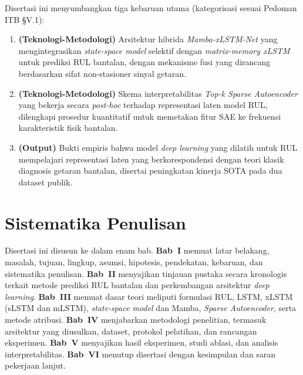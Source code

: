 Disertasi ini menyumbangkan tiga kebaruan utama (kategorisasi
sesuai Pedoman ITB §V.1):

\begin{enumerate}
  \item \textbf{(Teknologi-Metodologi)} Arsitektur hibrida
        \emph{Mamba-xLSTM-Net} yang mengintegrasikan
        \emph{state-space model} selektif dengan
        \emph{matrix-memory xLSTM} untuk prediksi RUL bantalan,
        dengan mekanisme fusi yang dirancang berdasarkan sifat
        non-stasioner sinyal getaran.
  \item \textbf{(Teknologi-Metodologi)} Skema interpretabilitas
        \emph{Top-k Sparse Autoencoder} yang bekerja secara
        \emph{post-hoc} terhadap representasi laten model RUL,
        dilengkapi prosedur kuantitatif untuk memetakan fitur SAE
        ke frekuensi karakteristik fisik bantalan.
  \item \textbf{(Output)} Bukti empiris bahwa model \emph{deep
        learning} yang dilatih untuk RUL mempelajari representasi
        laten yang berkorespondensi dengan teori klasik diagnosis
        getaran bantalan, disertai peningkatan kinerja SOTA pada
        dua dataset publik.
\end{enumerate}

\section{Sistematika Penulisan}
\label{subsec:bab1_sistematika}

Disertasi ini disusun ke dalam enam bab. \textbf{Bab~I} memuat latar
belakang, masalah, tujuan, lingkup, asumsi, hipotesis, pendekatan,
kebaruan, dan sistematika penulisan. \textbf{Bab~II} menyajikan
tinjauan pustaka secara kronologis terkait metode prediksi RUL
bantalan dan perkembangan arsitektur \emph{deep learning}.
\textbf{Bab~III} memuat dasar teori meliputi formulasi RUL, LSTM,
xLSTM (sLSTM dan mLSTM), \emph{state-space model} dan Mamba,
\emph{Sparse Autoencoder}, serta metode atribusi.
\textbf{Bab~IV} menjabarkan metodologi penelitian, termasuk
arsitektur yang diusulkan, dataset, protokol pelatihan, dan
rancangan eksperimen. \textbf{Bab~V} menyajikan hasil eksperimen,
studi ablasi, dan analisis interpretabilitas. \textbf{Bab~VI}
menutup disertasi dengan kesimpulan dan saran pekerjaan lanjut.

